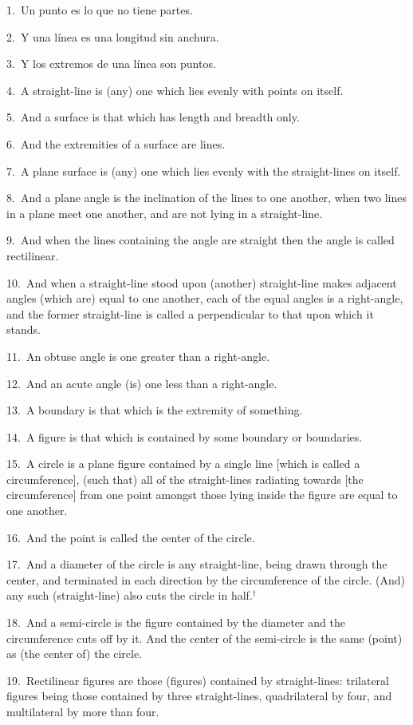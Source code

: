 \begin{Parallel}{}{}
{1.~Un punto es lo que no tiene partes.

2.~Y una línea es una longitud sin anchura.

3.~Y los extremos de una línea son puntos.

4.~A straight-line is (any) one which lies  evenly with points on itself.

5.~And a surface is that which has length and breadth only.

6.~And the extremities of a surface are lines.

7.~A plane surface is (any) one which lies evenly with the straight-lines on itself.

8.~And a plane angle is the inclination of the lines to one another, when two lines in a plane 
meet one another, and are not lying in a straight-line.

9.~And when the lines containing the angle are straight then the angle is called rectilinear.

10.~And when a straight-line stood upon (another) straight-line makes adjacent angles (which are) equal to one another, each of the equal angles is a
right-angle, and the former straight-line  is called a perpendicular to that upon which it stands.

11.~An obtuse angle is one greater than a right-angle.

12.~And an acute angle (is) one less than a right-angle.

13.~A boundary is that which is the extremity of something.

14.~A figure is that which is contained by some boundary or boundaries.

15.~A circle is a plane figure  contained by a single line [which is called a circumference], (such that) all of the straight-lines  radiating towards
 [the circumference] from one
point amongst those lying inside the figure  are equal to one another.

16.~And the point is called the center of the circle.

17.~And a diameter of the circle is any straight-line, being drawn through the
center, and terminated in each direction by the circumference of the circle. (And) any such (straight-line) also cuts the circle in half.$^\dag$

18.~And a semi-circle is the figure contained by the diameter  and
the circumference  cuts off by it. And the center of the semi-circle is the same (point)
as (the center of) the circle.

19.~Rectilinear figures are those (figures) contained by straight-lines: trilateral
figures being those contained by three straight-lines,  quadrilateral   by four,
and multilateral by more than four.

}
\end{Parallel}
